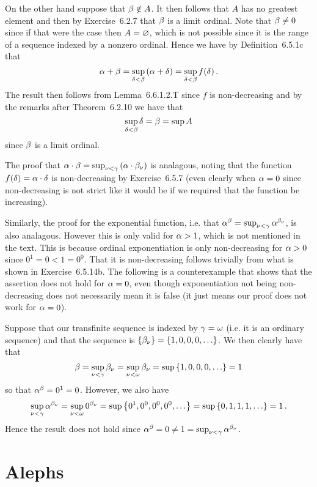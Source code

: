 \begin{questions}
\begin{solution}
{        On the other hand suppose that $\beta \notin A$.
        It then follows that $A$ has no greatest element and then by Exercise~6.2.7 that $\beta$ is a limit ordinal.
        Note that $\beta \neq 0$ since if that were the case then $A = \varnothing$, which is not possible since it is the range of a sequence indexed by a nonzero ordinal.
        Hence we have by Definition~6.5.1c that
        $$
        \alpha + \beta = \sup_{\delta < \beta} \left( \alpha + \delta \right) = \sup_{\delta < \beta} f(\delta) \,.
        $$
        The result then follows from Lemma~6.6.1.2.T since $f$ is non-decreasing and by the remarks after Theorem~6.2.10 we have that
        $$
        \sup_{\delta < \beta} \delta = \beta = \sup{A}
        $$
        since $\beta$ is a limit ordinal. \qedsymbol
   }

   The proof that $\alpha \cdot \beta = \sup_{\nu < \gamma} \left( \alpha \cdot \beta_\nu \right)$ is analagous, noting that the function $f(\delta) = \alpha \cdot \delta$ is non-decreasing by Exercise~6.5.7 (even clearly when $\alpha = 0$ since non-decreasing is not strict like it would be if we required that the function be increasing).

   Similarly, the proof for the exponential function, i.e. that $\alpha^\beta = \sup_{\nu < \gamma} \alpha^{\beta_\nu}$, is also analagous.
   However this is only valid for $\alpha > 1$, which is not mentioned in the text.
   This is because ordinal exponentiation is only non-decreasing for $\alpha > 0$ since $0^1 = 0 < 1 = 0^0$.
   That it is non-decreasing follows trivially from what is shown in Exercise~6.5.14b.
   The following is a counterexample that shows that the assertion does not hold for $\alpha = 0$, even though exponentiation not being non-decreasing does not necessarily mean it is false (it just means our proof does not work for $\alpha = 0$).

   Suppose that our transfinite sequence is indexed by $\gamma = \omega$ (i.e. it is an ordinary sequence) and that the sequence is $\left\{ \beta_\nu \right\} = \left\{ 1, 0, 0, 0, \ldots \right\}$.
   We then clearly have that
   $$
   \beta = \sup_{\nu < \gamma} \beta_\nu = \sup_{\nu < \omega} \beta_\nu = \sup \left\{ 1, 0, 0, 0, \ldots \right\} = 1
   $$
   so that $\alpha^\beta = 0^1 = 0$.
   However, we also have
   $$
   \sup_{\nu < \gamma} \alpha^{\beta_\nu} = \sup_{\nu < \omega} 0^{\beta_\nu} = \sup\left\{ 0^1, 0^0, 0^0, 0^0, \ldots \right\} = \sup\left\{ 0, 1, 1, 1, \ldots \right\} = 1 \,.
   $$
   Hence the result does not hold since $\alpha^\beta = 0 \neq 1 = \sup_{\nu < \gamma} \alpha^{\beta_\nu}$.
\end{solution}

\section{Alephs}


\end{questions}
